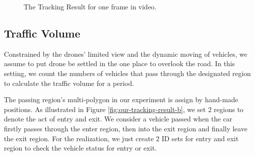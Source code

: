 \documentclass[10pt,twocolumn,letterpaper]{article}  %
\begin{document}
\begin{figure}[htbp]
	\centering
	\centering
	\vspace{0.2cm}
	\caption{The Tracking Result for one frame in video.}
	\label{fig:our-tracking-result}
\end{figure}

\subsection{Traffic Volume}
Constrained by the drones' limited view and the dynamic moving of vehicles, we assume to put drone be settled in the one place to overlook the road. In this setting, we count the numbers of vehicles that pass through the designated region to calculate the traffic volume for a period. 

The passing region's multi-polygon in our experiment is assign by hand-made positions. As illustrated in Figure \ref{fig:our-tracking-result-b}, we set 2 regions to denote the act of entry and exit. We consider a vehicle passed when the car firstly passes through the enter region, then into the exit region and finally leave the exit region. For the realization, we just create 2 ID sets for entry and exit region to check the vehicle status for entry or exit.
\end{document}
